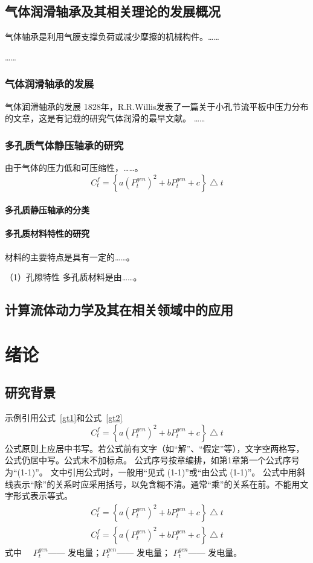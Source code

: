 \documentclass[a4paper, twoside, openany]{NCEPUMaster}
\begin{document}
\section{气体润滑轴承及其相关理论的发展概况} %
气体轴承是利用气膜支撑负荷或减少摩擦的机械构件。……

…… 
\subsection{气体润滑轴承的发展} %

气体润滑轴承的发展
1828年，R.R.Willis发表了一篇关于小孔节流平板中压力分布的文章，这是有记载的研究气体润滑的最早文献。
…… 
\subsection{多孔质气体静压轴承的研究} 
由于气体的压力低和可压缩性，……。
\begin{equation}
\label{gt1}
 C^f_t=\left \{a(P_t^{gen})^2 + b P_t^{gen}+c\right \} \bigtriangleup t
\end{equation}
\subsubsection{多孔质静压轴承的分类}


\subsubsection{多孔质材料特性的研究}
材料的主要特点是具有一定的……。

{\Heiti （1）孔隙特性} 多孔质材料是由……。



\section{计算流体动力学及其在相关领域中的应用}
\chapter{绪论}

\section{研究背景}
示例引用公式~\ref{gt1}和公式~\ref{gt2}
\begin{equation}
 C^f_t=\left \{a(P_t^{gen})^2 + b P_t^{gen}+c\right \} \bigtriangleup t
 \label{gt1}
\end{equation}
公式原则上应居中书写。若公式前有文字（如“解”、“假定”等），文字空两格写，公式仍居中写。公式末不加标点。
公式序号按章编排，如第1章第一个公式序号为“(1-1)”。
文中引用公式时，一般用“见式 (1-1)”或“由公式 (1-1)”。
公式中用斜线表示“除”的关系时应采用括号，以免含糊不清。通常“乘”的关系在前。不能用文字形式表示等式。
\begin{gather}
    C^f_t=\left \{a(P_t^{gen})^2 + b P_t^{gen}+c\right \} \bigtriangleup t \label{gt2} \\
    C^f_t=\left \{a(P_t^{gen})^2 + b P_t^{gen}+c\right \} \bigtriangleup t \label{gt3}
\end{gather}
式中~~  $P_t^{gen}$------ 发电量；\breakwithtilde $P_t^{gen}$------ 发电量；
\breakwithtilde $P_t^{gen}$------ 发电量。
\end{document}
